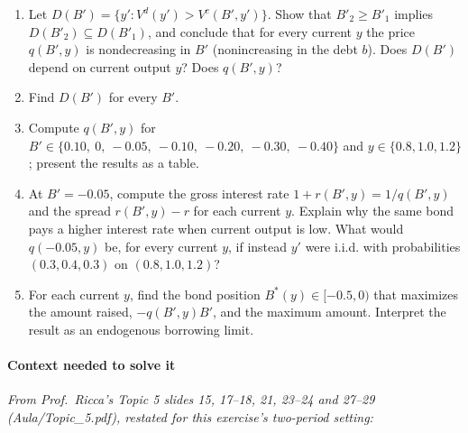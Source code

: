 \documentclass[11pt,a4paper]{article}
\begin{document}
\begin{enumerate}
\def\labelenumi{(\alph{enumi})}
\item
  Let \(D(B') = \{y' : V^d(y') > V^c(B', y')\}\). Show that \(B'_2 \ge B'_1\) implies
  \(D(B'_2) \subseteq D(B'_1)\), and conclude that for every current \(y\) the price \(q(B', y)\) is
  nondecreasing in \(B'\) (nonincreasing in the debt \(b\)). Does \(D(B')\) depend on current output
  \(y\)? Does \(q(B', y)\)?
\item
  Find \(D(B')\) for every \(B'\).
\item
  Compute \(q(B', y)\) for \(B' \in \{0.10,\ 0,\ -0.05,\ -0.10,\ -0.20,\ -0.30,\ -0.40\}\) and
  \(y \in \{0.8, 1.0, 1.2\}\); present the results as a table.
\item
  At \(B' = -0.05\), compute the gross interest rate \(1 + r(B', y) = 1/q(B', y)\) and the spread
  \(r(B', y) - r\) for each current \(y\). Explain why the same bond pays a higher interest rate
  when current output is low. What would \(q(-0.05, y)\) be, for every current \(y\), if instead
  \(y'\) were i.i.d. with probabilities \((0.3, 0.4, 0.3)\) on \((0.8, 1.0, 1.2)\)?
\item
  For each current \(y\), find the bond position \(B^*(y) \in [-0.5, 0)\) that maximizes the amount
  raised, \(-q(B', y)B'\), and the maximum amount. Interpret the result as an endogenous borrowing
  limit.
\end{enumerate}

\paragraph{Context needed to solve it}

\emph{From Prof.~Ricca's Topic 5 slides 15, 17--18, 21, 23--24 and 27--29 (Aula/Topic\_5.pdf),
restated for this exercise's two-period setting:}
\end{document}
